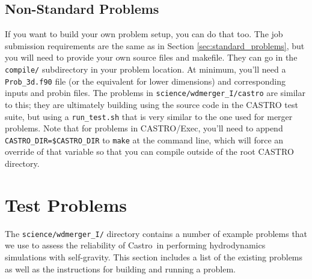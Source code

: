 \documentclass[12pt]{book}
\newcommand{\castro}{{\sf Castro}}
\begin{document}
\section{Non-Standard Problems}
\label{sec:non-standard_problems}

If you want to build your own problem setup, you can do that too. The job submission 
requirements are the same as in Section \ref{sec:standard_problems}, but you will need to provide 
your own source files and makefile. They can go in the \texttt{compile/} subdirectory in your problem location.
At minimum, you'll need a \texttt{Prob\_3d.f90} file (or the equivalent for lower dimensions) and
corresponding inputs and probin files. The problems in \texttt{science/wdmerger\_I/castro} are similar to this;
they are ultimately building using the source code in the CASTRO test suite, but using a
\texttt{run\_test.sh} that is very similar to the one used for merger problems. Note that for problems
in CASTRO/Exec, you'll need to append \texttt{CASTRO\_DIR=\$CASTRO\_DIR} to \texttt{make} at the
command line, which will force an override of that variable so that you can compile
outside of the root CASTRO directory.

\chapter{Test Problems}

The \texttt{science/wdmerger\_I/} directory contains a number of example problems that we use
to assess the reliability of \castro\ in performing hydrodynamics simulations 
with self-gravity. This section includes a list of the existing problems 
as well as the instructions for building and running a problem.
\end{document}

